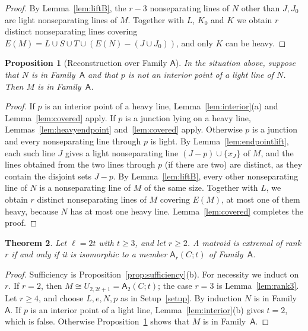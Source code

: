 \documentclass[11pt]{amsart}
\newtheorem{theorem}{Theorem}[section]
\newtheorem{proposition}[theorem]{Proposition}
\theoremstyle{definition}
\theoremstyle{remark}
\numberwithin{equation}{section}
\newcommand{\FA}{\mathsf{A}}
\begin{document}
\begin{proof}
By Lemma~\ref{lem:liftB}, the $r-3$ nonseparating lines of $N$ other than $J,J_0$ are light nonseparating lines of $M$. Together with $L$, $K_0$ and $K$ we obtain $r$ distinct nonseparating lines covering $E(M)=L\cup S\cup T\cup(E(N)-(J\cup J_0))$, and only $K$ can be heavy.
\end{proof}

\begin{proposition}[Reconstruction over Family $\FA$]\label{prop:inverseA}
In the situation above, suppose that $N$ is in Family~$\FA$ and that $p$ is not an interior point of a light line of $N$. Then $M$ is in Family~$\FA$.
\end{proposition}

\begin{proof}
If $p$ is an interior point of a heavy line, Lemma~\ref{lem:interior}(a) and Lemma~\ref{lem:covered} apply. If $p$ is a junction lying on a heavy line, Lemmas~\ref{lem:heavyendpoint} and~\ref{lem:covered} apply. Otherwise $p$ is a junction and every nonseparating line through $p$ is light. By Lemma~\ref{lem:endpointlift}, each such line $J$ gives a light nonseparating line $(J-p)\cup\{x_J\}$ of $M$, and the lines obtained from the two lines through $p$ (if there are two) are distinct, as they contain the disjoint sets $J-p$. By Lemma~\ref{lem:liftB}, every other nonseparating line of $N$ is a nonseparating line of $M$ of the same size. Together with $L$, we obtain $r$ distinct nonseparating lines of $M$ covering $E(M)$, at most one of them heavy, because $N$ has at most one heavy line. Lemma~\ref{lem:covered} completes the proof.
\end{proof}

\begin{theorem}\label{thm:even}
Let $\ell=2t$ with $t\ge3$, and let $r\ge2$. A matroid is extremal of rank $r$ if and only if it is isomorphic to a member $\FA_r(C;t)$ of Family~$\FA$.
\end{theorem}

\begin{proof}
Sufficiency is Proposition~\ref{prop:sufficiency}(b). For necessity we induct on $r$. If $r=2$, then $M\cong U_{2,2t+1}=\FA_2(C;t)$; the case $r=3$ is Lemma~\ref{lem:rank3}. Let $r\ge4$, and choose $L,e,N,p$ as in Setup~\ref{setup}. By induction $N$ is in Family~$\FA$. If $p$ is an interior point of a light line, Lemma~\ref{lem:interior}(b) gives $t=2$, which is false. Otherwise Proposition~\ref{prop:inverseA} shows that $M$ is in Family~$\FA$.
\end{proof}
\end{document}
